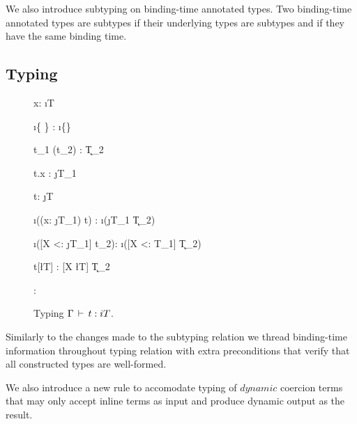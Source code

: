 We also introduce subtyping on binding-time annotated types. Two binding-time annotated
types are subtypes if their underlying types are subtypes and if they have the same binding time.

\subsection{Typing}

\begin{figure}[H]
  {\Gamma \ts x: \i{T}}

  {\Gamma \ts \i{\{  \}} : \i{\{\}}}

  {\Gamma \ts t_1 (t_2) : \k{T_2}}

  {\Gamma \ts t.x : \j{T_1}}

  {\Gamma \ts t: \j{T}}

  {\Gamma \ts \i{((x: \j{T_1}) \ra t)} : \i{(\j{T_1} \ra \k{T_2})}}

  {\Gamma \ts \i([X <: \j{T_1}] \ra t_2): \i{([X <: T_1] \ra \k{T_2})}}

  {\Gamma \ts t[\l{T}] : [X \mapsto \l{T}] \k{T_2}}

  {\Gamma \ts {} : }
\caption{Typing $\Gamma \,\vdash\, t: i T$.}
\end{figure}

Similarly to the changes made to the subtyping relation we thread binding-time information
throughout typing relation with extra preconditions that verify that all constructed types
are well-formed.

We also introduce a new rule to accomodate typing of $dynamic$ coercion terms that may
only accept inline terms as input and produce dynamic output as the result.

